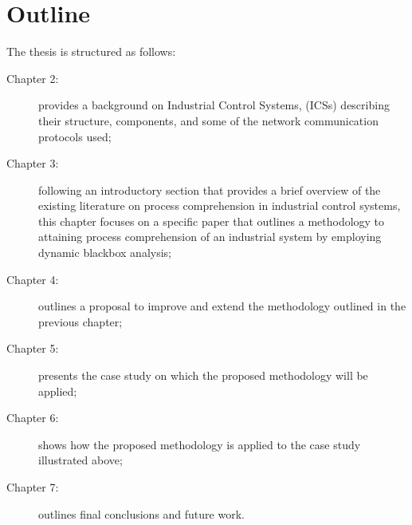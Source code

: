 \section{Outline}
\label{sec:1_outline}
\noindent The thesis is structured as follows:

\begin{description}
	\item [Chapter 2:] provides a background on Industrial Control Systems, (ICSs) describing their structure, components, and some of the network communication protocols used;
	\item [Chapter 3:] following an introductory section that provides a brief overview of the existing literature on process comprehension in industrial control systems, this chapter focuses on a specific paper that outlines a methodology to attaining process comprehension of an industrial system by employing dynamic blackbox analysis;
	\item [Chapter 4:] outlines a proposal to improve and extend the methodology outlined in the previous chapter;
	\item [Chapter 5:] presents the case study on which the proposed methodology will be applied;
	\item [Chapter 6:] shows how the proposed methodology is applied to the case study illustrated above;
	\item [Chapter 7:] outlines final conclusions and future work.
\end{description}

\vfill
\nolinenumbers